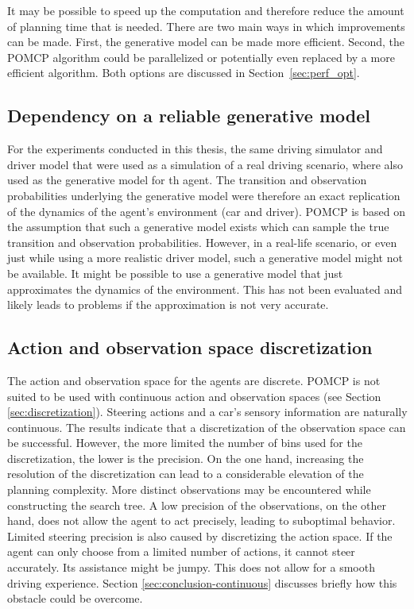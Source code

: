 It may be possible to speed up the computation and therefore reduce the amount of planning time that is needed. There are two main ways in which improvements can be made. First, the generative model can be made more efficient. Second, the POMCP algorithm could be parallelized or potentially even replaced by a more efficient algorithm. Both options are discussed in Section~\ref{sec:perf_opt}. 

\subsection{Dependency on a reliable generative model}

For the experiments conducted in this thesis, the same driving simulator and driver model that were used as a simulation of a real driving scenario, where also used as the generative model for th agent. The transition and observation probabilities underlying the generative model were therefore an exact replication of the dynamics of the agent's environment (car and driver). POMCP is based on the assumption that such a generative model exists which can sample the true transition and observation probabilities. However, in a real-life scenario, or even just while using a more realistic driver model, such a generative model might not be available. It might be possible to use a generative model that just approximates the dynamics of the environment. This has not been evaluated and likely leads to problems if the approximation is not very accurate.

\subsection{Action and observation space discretization}

The action and observation space for the agents are discrete. POMCP is not suited to be used with continuous action and observation spaces (see Section \ref{sec:discretization}). Steering actions and a car's sensory information are naturally continuous. The results indicate that a discretization of the observation space can be successful. However, the more limited the number of bins used for the discretization, the lower is the precision. On the one hand, increasing the resolution of the discretization can lead to a considerable elevation of the planning complexity. More distinct observations may be encountered while constructing the search tree. A low precision of the observations, on the other hand, does not allow the agent to act precisely, leading to suboptimal behavior. Limited steering precision is also caused by discretizing the action space. If the agent can only choose from a limited number of actions, it cannot steer accurately. Its assistance might be jumpy. This does not allow for a smooth driving experience. Section \ref{sec:conclusion-continuous} discusses briefly how this obstacle could be overcome. 

